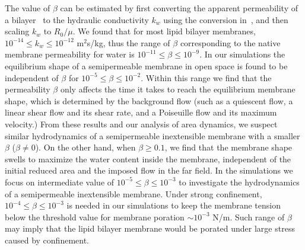 \documentclass[prb,preprint,showpacs,preprintnumbers,amsmath,amssymb,longbibliography]{revtex4-1}
\begin{document}
The value of $\beta$ can be estimated by first
converting the apparent permeability of a 
bilayer~\cite{OlbrichRawiczNeedhamEtAl2000_BJ} to the hydraulic
conductivity $k_w$ using the conversion
in~\citet{FettiplaceHaydon1980_PhysRev}, and then scaling $k_w$ to $R_0/\mu$. We found that for most lipid bilayer membranes, $10^{-14}\le
k_w\le 10^{-12}$ m$^2$s/kg, thus the range of $\beta$ corresponding to the native membrane permeability for water is $10^{-11}\le
\beta\le 10^{-9}$. 
%
In our simulations the equilibrium shape of a semipermeable membrane in open space is found to be independent of $\beta$ for $10^{-5}\le\beta\le10^{-2}$.
Within this range we find that the permeability $\beta$ only affects the time it takes to reach the equilibrium membrane shape, which is determined by the background flow
(such as a quiescent flow, a linear shear flow and its shear rate, and a Poiseuille flow and its maximum velocity.)
From these results and our analysis of area dynamics, we suspect similar hydrodynamics of a semipermeable inextensible membrane 
with a smaller $\beta$ ($\beta\ne 0$). 
On the other hand,  when $\beta\ge 0.1$, we find that the membrane shape swells to maximize the water content inside the membrane, independent of the initial reduced 
area and the imposed flow in the far field.
In the simulations we focus on intermediate value of $10^{-5}\le \beta\le 10^{-3}$ to investigate the hydrodynamics of a semipermeable inextensible membrane. 
%
Under strong confinement, $10^{-4}\le\beta\le10^{-3}$ is needed in our
simulations to keep the membrane tension below the threshold value for
membrane poration $\sim 10^{-3}$ N/m. Such range of $\beta$ may imply
that the lipid bilayer membrane would be porated under large stress
caused by confinement.
\end{document}
